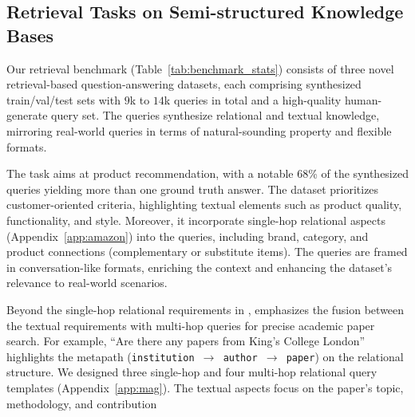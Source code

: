 
\subsection{Retrieval Tasks on Semi-structured Knowledge Bases}
\label{sec:star}
Our retrieval benchmark (Table~\ref{tab:benchmark_stats}) consists of three novel retrieval-based question-answering datasets, each comprising synthesized train/val/test sets with $9$k to $14$k queries in total and a high-quality human-generate query set.
The queries synthesize relational and textual knowledge, mirroring real-world queries in terms of natural-sounding property and flexible formats.


\xhdr{\amazont} 
The task aims at product recommendation, with a notable 68\% of the synthesized queries yielding more than one ground truth answer. The dataset prioritizes customer-oriented criteria, highlighting textual elements such as product quality, functionality, and style. Moreover, it incorporate single-hop relational aspects (Appendix~\ref{app:amazon}) into the queries, including brand, category, and product connections (\eg complementary or substitute items). The queries are framed in conversation-like formats, enriching the context and enhancing the dataset's relevance to real-world scenarios.


\xhdr{\magt} 
Beyond the single-hop relational requirements in \amazont, \magh emphasizes the fusion between the textual requirements with multi-hop queries for precise academic paper search. For example, ``Are there any papers from King's College London'' highlights the metapath (\texttt{institution $\rightarrow$ author $\rightarrow$ paper}) on the relational structure. 
We designed three single-hop and four multi-hop relational query templates (Appendix~\ref{app:mag}). The textual aspects focus on the paper's topic, methodology, and contribution \etc

